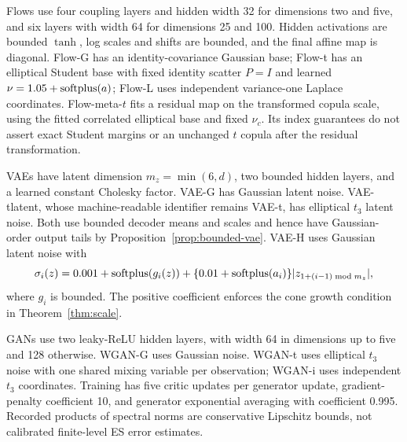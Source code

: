 \documentclass[11pt]{article}
\theoremstyle{definition}\newtheorem{definition}[theorem]{Definition}
\theoremstyle{remark}\newtheorem{remark}[theorem]{Remark}
\begin{document}
Flows use four coupling layers and hidden width 32 for dimensions two and five, and six layers with width 64 for dimensions 25 and 100. Hidden activations are bounded $\tanh$, log scales and shifts are bounded, and the final affine map is diagonal. Flow-G has an identity-covariance Gaussian base; Flow-t has an elliptical Student base with fixed identity scatter $P=I$ and learned $\nu=1.05+\operatorname{softplus}(a)$; Flow-L uses independent variance-one Laplace coordinates. Flow-meta-$t$ fits a residual map on the transformed copula scale, using the fitted correlated elliptical base and fixed $\nu_c$. Its index guarantees do not assert exact Student margins or an unchanged $t$ copula after the residual transformation.

VAEs have latent dimension $m_z=\min(6,d)$, two bounded hidden layers, and a learned constant Cholesky factor. VAE-G has Gaussian latent noise. VAE-tlatent, whose machine-readable identifier remains VAE-t, has elliptical $t_3$ latent noise. Both use bounded decoder means and scales and hence have Gaussian-order output tails by Proposition~\ref{prop:bounded-vae}. VAE-H uses Gaussian latent noise with
\begin{equation}\label{eq:implemented-scale}
\sigma_i(z)=0.001+\operatorname{softplus}(g_i(z))+
\{0.01+\operatorname{softplus}(a_i)\}|z_{1+(i-1)\bmod m_z}|,
\end{equation}
where $g_i$ is bounded. The positive coefficient enforces the cone growth condition in Theorem~\ref{thm:scale}.

GANs use two leaky-ReLU hidden layers, with width 64 in dimensions up to five and 128 otherwise. WGAN-G uses Gaussian noise. WGAN-t uses elliptical $t_3$ noise with one shared mixing variable per observation; WGAN-i uses independent $t_3$ coordinates. Training has five critic updates per generator update, gradient-penalty coefficient 10, and generator exponential averaging with coefficient 0.995. Recorded products of spectral norms are conservative Lipschitz bounds, not calibrated finite-level ES error estimates.
\end{document}

